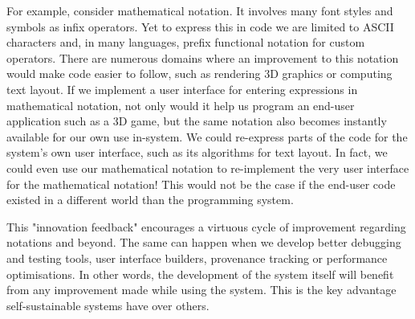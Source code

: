 {For example, consider mathematical notation. It involves many font styles and symbols as infix operators. Yet to express this in code we are limited to ASCII characters and, in many languages, prefix functional notation for custom operators. There are numerous domains where an improvement to this notation would make code easier to follow, such as rendering 3D graphics or computing text layout. If we implement a user interface for entering expressions in mathematical notation, not only would it help us program an end-user application such as a 3D game, but the same notation also becomes instantly available for our own use in-system. We could re-express parts of the code for the system's own user interface, such as its algorithms for text layout. In fact, we could even use our mathematical notation to re-implement the very user interface for the mathematical notation! This would not be the case if the end-user code existed in a different world than the programming system.

This "innovation feedback" encourages a virtuous cycle of improvement regarding notations and beyond. The same can happen when we develop better debugging and testing tools, user interface builders, provenance tracking or performance optimisations. In other words, the development of the system itself will benefit from any improvement made while using the system. This is the key advantage self-sustainable systems have over others.
}
